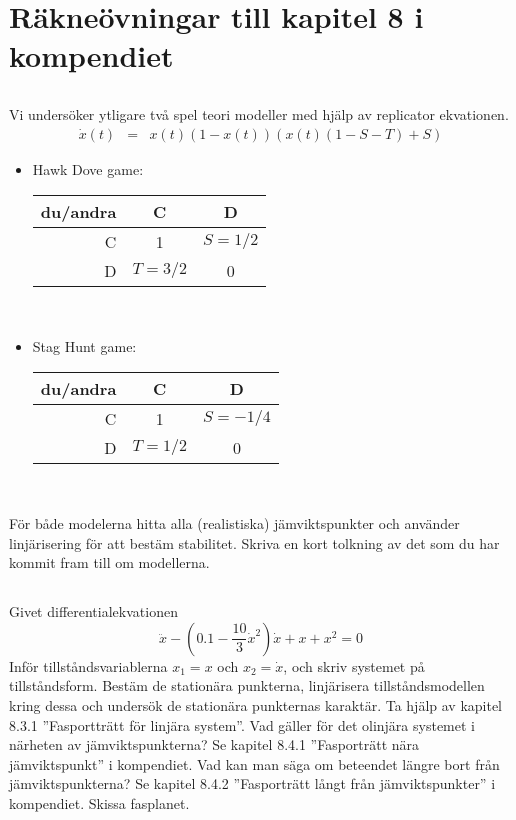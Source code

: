 

\section{Räkneövningar till kapitel 8 i kompendiet}


\subsection{}
Vi undersöker ytligare två spel teori modeller med hjälp av replicator ekvationen.
\begin{eqnarray*}
\dot{x}(t) & = &  x(t) (1-x(t)) (x(t)(1 - S - T) + S) 
\label{repeqf}
\end{eqnarray*}
\begin{itemize}
\item Hawk Dove game:
\center
\begin{tabular}{r|cc}
du/andra & C & D \\
\hline 
C  & 1 & $S=1/2$ \\
D & $T=3/2$ & 0 
\end{tabular}\\[1mm]

\flushleft
\item Stag Hunt game:
\center
\begin{tabular}{r|cc}
du/andra & C & D \\
\hline 
C  & 1 & $S=-1/4$ \\
D & $T=1/2$ & 0 
\end{tabular}\\[1mm]
\end{itemize}
För både modelerna hitta alla (realistiska) jämviktspunkter och använder linjärisering för att bestäm stabilitet.  Skriva en kort tolkning av det som du har kommit fram till om modellerna.

\subsection{}
Givet differential\-ekvationen
$$
\ddot{x} - (0.1 - \frac{10}{3} \dot{x}^2 ) \dot{x} + x + x^2 = 0
$$
Inför tillståndsvariablerna $x_1 = x $ och $x_2 = \dot{x} $, och skriv  systemet på tillståndsform. 
Bestäm de stationära punkterna, linjärisera tillståndsmodellen kring dessa och undersök de stationära punkternas karaktär.
Ta hjälp av kapitel 8.3.1 ''Fasportträtt för linjära system''. 
Vad gäller för det olinjära systemet i närheten av jämviktspunkterna?  Se kapitel 8.4.1 ''Fasporträtt nära jämviktspunkt'' i kompendiet.
Vad kan man säga om beteendet längre bort från jämviktspunkterna?  Se kapitel 8.4.2 ''Fasporträtt långt från jämviktspunkter'' i kompendiet.
Skissa fasplanet.


